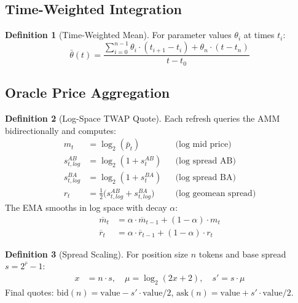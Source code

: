 \documentclass[10pt,a4paper,twocolumn]{article}
\theoremstyle{definition}
\newtheorem{definition}{Definition}[section]
\theoremstyle{plain}
\theoremstyle{remark}
\begin{document}
\subsection{Time-Weighted Integration}

\begin{definition}[Time-Weighted Mean]
\label{def:time-weighted-mean}
For parameter values $\theta_i$ at times $t_i$:
\begin{equation}
\bar{\theta}(t) = \frac{\sum_{i=0}^{n-1} \theta_i \cdot (t_{i+1} - t_i) + \theta_n \cdot (t - t_n)}{t - t_0}
\end{equation}
\end{definition}

\subsection{Oracle Price Aggregation}

\begin{definition}[Log-Space TWAP Quote]
\label{def:twap-quote}
Each refresh queries the AMM bidirectionally and computes:
\begin{align}
m_t &= \log_2(\bar{p}_t) && \text{(log mid price)} \\
s^{AB}_{t,log} &= \log_2(1 + s^{AB}_t) && \text{(log spread AB)} \\
s^{BA}_{t,log} &= \log_2(1 + s^{BA}_t) && \text{(log spread BA)} \\
r_t &= \tfrac{1}{2}\bigl(s^{AB}_{t,log} + s^{BA}_{t,log}\bigr) && \text{(log geomean spread)}
\end{align}
The EMA smooths in log space with decay $\alpha$:
\begin{align}
\overline{m}_t &= \alpha \cdot \overline{m}_{t-1} + (1{-}\alpha) \cdot m_{t} \\
\overline{r}_t &= \alpha \cdot \overline{r}_{t-1} + (1{-}\alpha) \cdot r_{t}
\end{align}
\end{definition}

\begin{definition}[Spread Scaling]
\label{def:spread-scaling}
For position size $n$ tokens and base spread $s = 2^{\overline{r}} - 1$:
\begin{align}
x &= n \cdot s, \quad \mu = \log_2(2x + 2), \quad s' = s \cdot \mu
\end{align}
Final quotes: $\text{bid}(n) = \text{value} - s' \cdot \text{value}/2$, $\text{ask}(n) = \text{value} + s' \cdot \text{value}/2$.
\end{definition}
\end{document}
